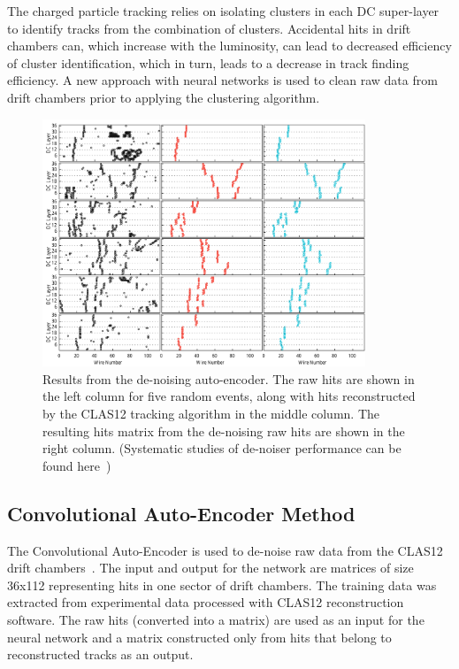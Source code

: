 \documentclass{webofc}
\begin{document}
The charged particle tracking relies on isolating clusters in each DC super-layer to identify tracks from the combination of clusters.
Accidental hits in drift chambers can, which increase with the luminosity, can lead to decreased efficiency of cluster identification, which 
in turn, leads to a decrease in track finding efficiency. A new approach with neural networks is used to clean raw data from drift chambers 
prior to applying the clustering algorithm. 
\begin{figure}[!h]
\begin{center}
 \includegraphics[width=3.8in]{images/cnn_denoise_results.pdf}
\caption {Results from the de-noising auto-encoder. The raw hits are shown
in the left column for five random events, along with hits reconstructed by the 
CLAS12 tracking algorithm in the middle column. The resulting  hits matrix 
from the de-noising raw hits are shown in the right column. (Systematic studies 
of de-noiser performance can be found here~\cite{Thomadakis:2022zcd})}
 \label{network:cnn_results}
 \end{center}
\end{figure}


\subsection{Convolutional Auto-Encoder Method}
\label{aue-method}


The Convolutional Auto-Encoder is used to de-noise raw data from the CLAS12 drift chambers~\cite{Thomadakis:2022zcd}. 
The input and output for the network are matrices of size 36x112 representing hits in one sector of drift chambers. 
The training data was extracted from experimental data processed with CLAS12 reconstruction software. 
The raw hits (converted into a matrix) are used as an input for the neural network and a matrix constructed 
only from hits that belong to reconstructed tracks as an output. 
\end{document}
